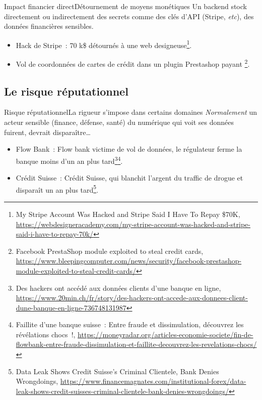 \documentclass{beamer}
\begin{document}
    \begin{frame}{Impact financier direct}{Détournement de moyens monétiques}
        Un backend stock directement ou indirectement des secrets comme des clés d'API (Stripe, \textit{etc}), des données financières sensibles.
        \begin{itemize}
            \item Hack de Stripe~: 70 k\$ détournés à une web designeuse\footnote{My Stripe Account Was Hacked and Stripe Said I Have To Repay \$70K, \url{https://webdesigneracademy.com/my-stripe-account-was-hacked-and-stripe-said-i-have-to-repay-70k/}}.
            \item Vol de coordonnées de cartes de crédit dans un plugin Prestashop payant \footnote{Facebook PrestaShop module exploited to steal credit cards, \url{https://www.bleepingcomputer.com/news/security/facebook-prestashop-module-exploited-to-steal-credit-cards/}}.
        \end{itemize}
    \end{frame}

    \subsection{Le risque réputationnel}\label{subsec:risque-reputationnel}
    \begin{frame}{Risque réputationnel}{La rigueur s'impose dans certains domaines}
        \textit{Normalement} un acteur sensible (finance, défense, santé) du numérique qui voit ses données fuirent, devrait disparaître\ldots
        \begin{itemize}
            \item Flow Bank~: Flow bank victime de vol de données, le régulateur ferme la banque moins d'un an plus tard\footnote{Des hackers ont accédé aux données clients d’une banque en ligne, \url{https://www.20min.ch/fr/story/des-hackers-ont-accede-aux-donnees-client-dune-banque-en-ligne-736748131987}}\footnotestep\footnote{Faillite d’une banque suisse~: Entre fraude et dissimulation, découvrez les révélations chocs~!, \url{https://moneyradar.org/articles-economie-societe/fin-de-flowbank-entre-fraude-dissimulation-et-faillite-decouvrez-les-revelations-chocs/}}.
            \item Crédit Suisse~: Crédit Suisse, qui blanchit l'argent du traffic de drogue et disparaît un an plus tard\footnote{Data Leak Shows Credit Suisse’s Criminal Clientele, Bank Denies Wrongdoings, \url{https://www.financemagnates.com/institutional-forex/data-leak-shows-credit-suisses-criminal-clientele-bank-denies-wrongdoings/}}.
        \end{itemize}
    \end{frame}
\end{document}
